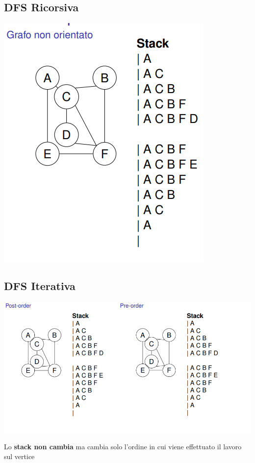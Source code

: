 \subsection{DFS Ricorsiva}

\begin{center}
    \includegraphics[scale = 0.6]{Capitoli/Grafi/Esempi/DFSNonOr.png}
\end{center}
\newpage
\subsection{DFS Iterativa}


\begin{center}
    \includegraphics[scale = 0.6]{Capitoli/Grafi/Esempi/DFSIter.png}
\end{center}
Lo \textbf{stack non cambia} ma cambia solo l'ordine in cui viene effettuato il lavoro sul vertice

